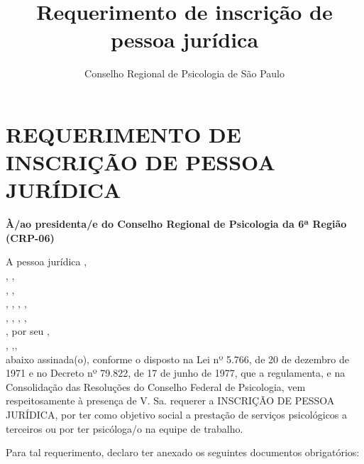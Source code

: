 \documentclass[openright, oneside, a4paper, article, brazil]{abntex2}
\title{Requerimento de inscrição de pessoa jurídica}
\author{Conselho Regional de Psicologia de São Paulo}
\begin{document}
\pagestyle{crp}
\centering
\Form
\section*{REQUERIMENTO DE INSCRIÇÃO DE PESSOA JURÍDICA}%

\setasuspacing{\DoubleSpacing}
\justifying
\textbf{À/ao presidenta/e do Conselho Regional de Psicologia da 6ª Região (CRP-06)}
\vspace{\baselineskip}

\noindent A pessoa jurídica  \hfill,\\
 \hfill, \hfill {} \hfill,\\
 ,  \hfill,\\
,  , , 	 \hfill,\\
 ,  ,  ,  \hfill,\\
 , por seu  \hfill,\\
 ,  ,\hfill,\\
\noindent
abaixo assinada(o), conforme o disposto na Lei nº 5.766, de 20 de dezembro de 1971 e no Decreto nº 79.822,
de 17 de junho de 1977, que a regulamenta, e na Consolidação das Resoluções do Conselho Federal de Psicologia,
vem respeitosamente à presença de V. Sa. requerer a INSCRIÇÃO DE PESSOA JURÍDICA, por ter como objetivo
social a prestação de serviços psicológicos a terceiros ou por ter psicóloga/o na equipe de trabalho.

Para tal requerimento, declaro ter anexado os seguintes documentos obrigatórios:
\end{document}
